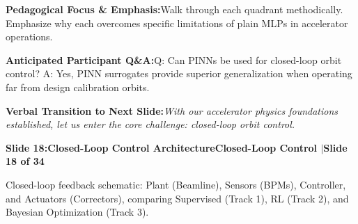 \documentclass[11pt,a4paper]{article}
\begin{document}
\vspace{0.2em}
\begin{tcolorbox}[colback=lightbg,colframe=bordergray,left=6pt,right=6pt,top=3pt,bottom=3pt,boxrule=0.6pt,arc=2.5pt]
\small
\noindent\textbf{\color{navy}Pedagogical Focus \& Emphasis:}\enspace Walk through each quadrant methodically. Emphasize why each overcomes specific limitations of plain MLPs in accelerator operations.\par\vspace{0.3em}
\noindent\textbf{\color{successgreen}Anticipated Participant Q\&A:}\enspace Q: Can PINNs be used for closed-loop orbit control? A: Yes, PINN surrogates provide superior generalization when operating far from design calibration orbits.\par\vspace{0.3em}
\noindent\textbf{\color{accent}Verbal Transition to Next Slide:}\enspace \emph{With our accelerator physics foundations established, let us enter the core challenge: closed-loop orbit control.}
\end{tcolorbox}
\clearpage
\hypertarget{slide.18}{}
{}
\noindent\begin{tcolorbox}[colback=navy,colframe=navy,left=6pt,right=6pt,top=3pt,bottom=3pt,boxrule=0pt,arc=2pt]
{\large\bfseries\color{white}Slide 18:\enspace Closed-Loop Control Architecture}\hfill{\footnotesize\bfseries\color{white!85!lightbg}Closed-Loop Control \enspace$|$\enspace Slide 18 of 34}
\end{tcolorbox}
\vspace{0.2em}
\begin{tcolorbox}[colback=lightbg,colframe=bordergray,title={\footnotesize\bfseries\color{darkgray}Slide Visual Blueprint},fontupper=\small,left=6pt,right=6pt,top=2.5pt,bottom=2.5pt,boxrule=0.6pt,arc=2.5pt]
Closed-loop feedback schematic: Plant (Beamline), Sensors (BPMs), Controller, and Actuators (Correctors), comparing Supervised (Track 1), RL (Track 2), and Bayesian Optimization (Track 3).
\end{tcolorbox}
\vspace{0.2em}
\end{document}
